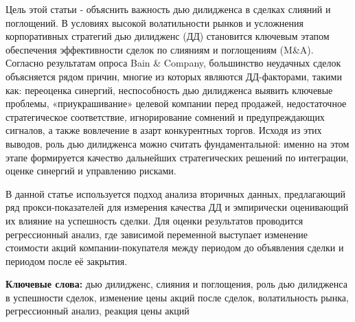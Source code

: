 Цель этой статьи - объяснить важность дью дилидженса в сделках слияний и
поглощений. В условиях высокой волатильности рынков и усложнения
корпоративных стратегий дью дилидженс (ДД) становится ключевым этапом
обеспечения эффективности сделок по слияниям и поглощениям (M\&A).
Согласно результатам опроса Bain \& Company, большинство неудачных
сделок объясняется рядом причин, многие из которых являются
ДД-факторами, такими как: переоценка синергий, неспособность дью
дилидженса выявить ключевые проблемы, «приукрашивание» целевой компании
перед продажей, недостаточное стратегическое соответствие, игнорирование
сомнений и предупреждающих сигналов, а также вовлечение в азарт
конкурентных торгов. Исходя из этих выводов, роль дью дилидженса можно
считать фундаментальной: именно на этом этапе формируется качество
дальнейших стратегических решений по интеграции, оценке синергий и
управлению рисками.

В данной статье используется подход анализа вторичных данных,
предлагающий ряд прокси-показателей для измерения качества ДД и
эмпирически оценивающий их влияние на успешность сделки. Для оценки
результатов проводится регрессионный анализ, где зависимой переменной
выступает изменение стоимости акций компании-покупателя между периодом
до объявления сделки и периодом после её закрытия.

{\bfseries Ключевые слова:} дью дилидженс, слияния и поглощения, роль дью
дилидженса в успешности сделок, изменение цены акций после сделок,
волатильность рынка, регрессионный анализ, реакция цены акций

